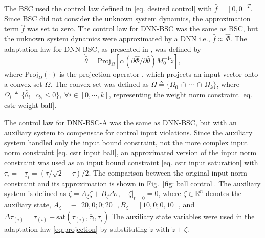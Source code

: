 \documentclass[lettersize,journal]{IEEEtran}
\begin{document}
The BSC used the control law defined in \eqref{eq. desired control} with $\hat f=[0,0]^T$. Since BSC did not consider the unknown system dynamics, the approximation term $\hat f$ was set to zero.
The control law for DNN-BSC was the same as BSC, but the unknown system dynamics were approximated by a DNN i.e., $\hat f\approx \hat\Phi$. The adaptation law for DNN-BSC, as presented in \cite{RN16}, was defined by 
\begin{equation}\label{eq:projection}
\dot {\hat\theta}= \text{Proj}_{\Omega}[\alpha  (\partial \hat\Phi/\partial \hat\theta)M_0^{-1}{\tilde z}],
\end{equation}
where $\text{Proj}_{\Omega}(\cdot)$ is the projection operator \cite[Appendix E, eq.~(E.4)]{RN20}, which projects an input vector onto a convex set $\Omega$. The convex set was defined as ${\Omega}\triangleq \{\Omega_0\,\cap\,\cdots\,\cap\, \Omega_k\}$, where $\Omega_i\triangleq \{\hat\theta_i\ \vert \ c_{b_i}\le 0\}, \ \forall i\in[0,\cdots, k]$, representing the weight norm constraint \eqref{eq. cstr weight ball}.

The control law for DNN-BSC-A was the same as DNN-BSC, but with an auxiliary system to compensate for control input violations. Since the auxiliary system handled only the input bound constraint, not the more complex input norm constraint \eqref{eq. cstr input ball}, an approximated version of the input norm constraint was used as an input bound constraint \eqref{eq. cstr input saturation} with ${\overline\tau_i} = -{\underline\tau_i} = (\bar\tau/\sqrt{2}+\bar\tau)/2$. The comparison between the original input norm constraint and its approximation is shown in Fig.~\ref{fig: ball control}.
The auxiliary system is defined as $\dot\zeta = A_\zeta \zeta + B_\zeta \Delta\tau,\quad \zeta\vert_{t=0} = 0$, where $\zeta\in\mathbb{R}^n$ denotes the auxiliary state, $A_\zeta=-[20,0;0;20],B_\zeta=[10,0;0,10]$, and $\Delta\tau_{(i)} = 
\tau_{(i)}-\text{sat}(\tau_{(i)},{\overline\tau_i},{\underline\tau_i})$
The auxiliary state variables were used in the adaptation law \eqref{eq:projection} by substituting ${\tilde z}$ with ${\tilde z}+\zeta$.
\end{document}
